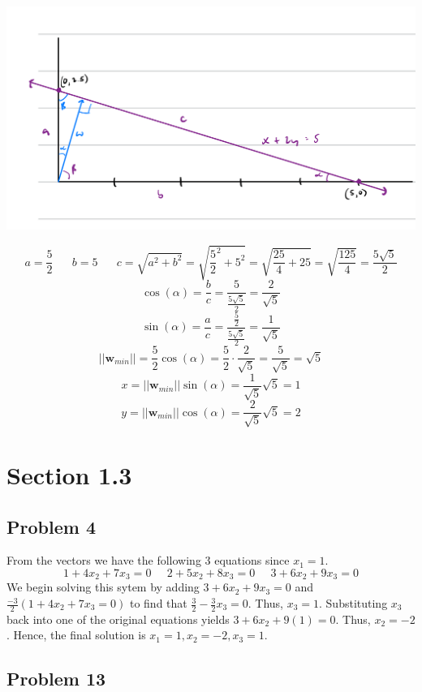 \documentclass[12pt]{article}
\begin{document}
\includegraphics[scale=0.25]{s12p28b.png}

\[a = \frac{5}{2} \; \; \; \; \; \; b = 5 \; \; \; \; \; \; c = \sqrt{a^2 + b^2} 
    = \sqrt{\frac{5}{2}^2 + 5^2} 
    = \sqrt{\frac{25}{4} + 25}
    = \sqrt{\frac{125}{4}}
    = \frac{5\sqrt{5}}{2}
\]
\[
    \cos(\alpha) = \frac{b}{c} 
    = \frac{5}{\frac{5\sqrt{5}}{2}}
    = \frac{2}{\sqrt{5}}
\] 
\[ 
    \sin(\alpha) = \frac{a}{c}
    = \frac{\frac{5}{2}}{\frac{5\sqrt{5}}{2}}
    = \frac{1}{\sqrt{5}}
\]
\[
    \vert \vert \boldsymbol{w}_{min} \vert \vert 
    = \frac{5}{2} \cos(\alpha) 
    = \frac{5}{2} \cdot \frac{2}{\sqrt{5}} 
    = \frac{5}{\sqrt{5}} = \sqrt{5}
\]
\[ 
    x = \vert \vert \boldsymbol{w}_{min} \vert \vert  \sin(\alpha)
    = \frac{1}{\sqrt{5}} \sqrt{5} = 1
\]
\[
    y = \vert \vert \boldsymbol{w}_{min} \vert \vert  \cos(\alpha)
    = \frac{2}{\sqrt{5}} \sqrt{5} = 2
\]

\section*{Section 1.3}

\subsection*{Problem 4}
From the vectors we have the following 3 equations since $x_1 = 1$.
\[
    1 + 4x_2 + 7x_3 = 0 \; \; \; \; \; 
    2 + 5x_2 + 8x_3 = 0 \; \; \; \; \; 
    3 + 6x_2 + 9x_3 = 0
\]
We begin solving this sytem by adding $3 + 6x_2 + 9x_3 = 0$ and $\frac{-3}{2}(1 + 4x_2 + 7x_3 = 0)$ to find that $\frac{3}{2} - \frac{3}{2}x_3 = 0$. Thus, $x_3 = 1$. Substituting $x_3$ back into one of the original equations yields $3 + 6x_2 + 9(1) = 0$. Thus, $x_2 = -2$. Hence, the final solution is $x_1 = 1, x_2 = -2, x_3 = 1$. 
\subsection*{Problem 13}
\end{document}
